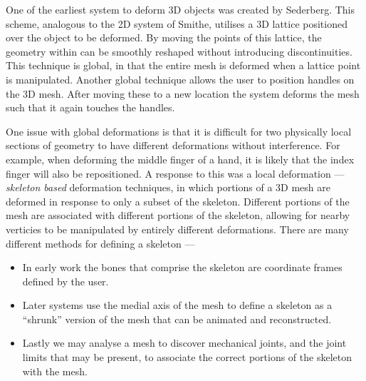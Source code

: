 


One of the earliest system to deform 3D objects was created by Sederberg\cite{Sederberg86}. This scheme, analogous to the 2D system of Smithe, utilises a 3D lattice positioned over the object to be deformed. By moving the points of this lattice, the geometry within can be smoothly reshaped without introducing discontinuities. This technique is global, in that the entire mesh is deformed when a lattice point is manipulated. Another global technique\cite{Borrel91} allows the user to position handles on the 3D mesh. After moving these to a new location the system deforms the mesh such that it again touches the handles.

One issue with global deformations is that it is difficult for two physically local sections of geometry to have different deformations without interference. For example, when deforming the middle finger of a hand, it is likely that the index finger will also be repositioned. A response to this was a local deformation --- \emph{skeleton based} deformation techniques, in which portions of a 3D mesh are deformed in response to only a subset of the skeleton. Different portions of the mesh are associated with different portions of the skeleton, allowing for nearby verticies to be manipulated by entirely different deformations. There are many different methods for defining a skeleton ---
\begin{itemize}
\item In early work\cite{Lewis00} the bones that comprise the skeleton are coordinate frames defined by the user.
\item Later systems\cite{Bloomenthal02,Yoshizawa07} use the medial axis of the mesh to define a skeleton as a ``shrunk'' version of the mesh that can be animated and reconstructed.   
\item Lastly we may analyse a mesh to discover mechanical joints, and the joint limits that may be present\cite{Xu09}, to associate the correct portions of the skeleton with the mesh.
\end{itemize}

